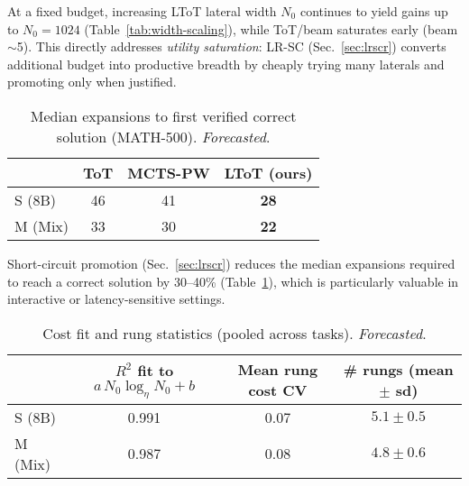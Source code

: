 \documentclass{article}
\begin{document}
\begin{table}[t]
\centering
\small
\caption{LToT success vs.\ initial lateral width $N_0$ at fixed total compute (S/M on MATH-500). \emph{Forecasted}. ToT saturates by beam 5; not shown.}
\vspace{0.3em}
\label{tab:width-scaling}
\end{table}

At a fixed budget, increasing LToT lateral width $N_0$ continues to yield gains up to $N_0{=}1024$ (Table~\ref{tab:width-scaling}), while ToT/beam saturates early (beam $\sim$5).
This directly addresses \emph{utility saturation}: LR-SC (Sec.~\ref{sec:lrscr}) converts additional budget into productive breadth by cheaply trying many laterals and promoting only when justified.

\begin{table}[t]
\centering
\caption{Median expansions to first verified correct solution (MATH-500). \emph{Forecasted}.}
\vspace{0.3em}
\begin{tabular}{lccc}
\toprule
 & \textbf{ToT} & \textbf{MCTS-PW} & \textbf{LToT (ours)} \\
\midrule
S (8B)  & 46  & 41  & \textbf{28} \\
M (Mix) & 33  & 30  & \textbf{22} \\
\bottomrule
\end{tabular}
\label{tab:ttfh}
\end{table}

Short-circuit promotion (Sec.~\ref{sec:lrscr}) reduces the median expansions required to reach a correct solution by 30--40\% (Table~\ref{tab:ttfh}), which is particularly valuable in interactive or latency-sensitive settings.

\begin{table*}[t]
\centering
\caption{Cost fit and rung statistics (pooled across tasks). \emph{Forecasted}.}
\vspace{0.3em}
\begin{tabular}{lccc}
\toprule
 & \textbf{$R^2$ fit to $a\,N_0\log_\eta N_0{+}b$} & \textbf{Mean rung cost CV} & \textbf{\# rungs (mean $\pm$ sd)} \\
\midrule
S (8B)  & 0.991 & 0.07 & $5.1 \pm 0.5$ \\
M (Mix) & 0.987 & 0.08 & $4.8 \pm 0.6$ \\
\bottomrule
\end{tabular}
\label{tab:cost-fit}
\end{table*}
\end{document}
